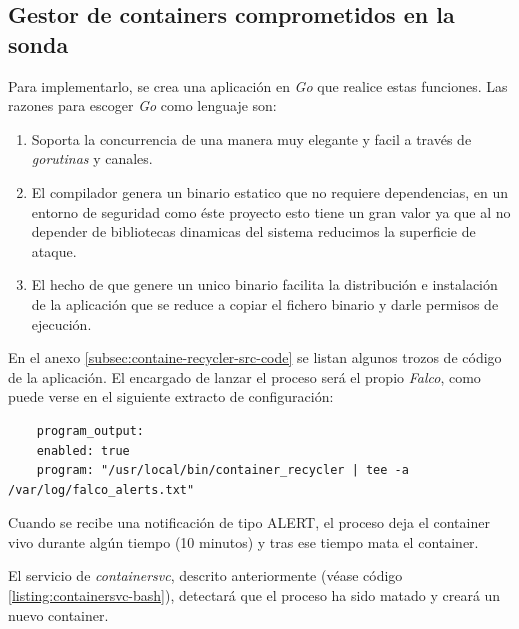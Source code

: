 \subsection{Gestor de containers comprometidos en la sonda}


Para implementarlo, se crea una aplicación en \emph{Go} que realice estas funciones. Las razones para escoger \emph{Go} como lenguaje son:

\begin{enumerate}
    \item Soporta la concurrencia de una manera muy elegante y facil a través de \emph{gorutinas} y canales.
    \item El compilador genera un binario estatico que no requiere dependencias, en un entorno de seguridad como éste proyecto esto
    tiene un gran valor ya que al no depender de bibliotecas dinamicas del sistema reducimos la superficie de ataque.
    \item El hecho de que genere un unico binario facilita la distribución e instalación de la aplicación que se reduce a copiar el fichero binario y darle permisos de ejecución.
\end{enumerate}

En el anexo \ref{subsec:containe-recycler-src-code} se listan algunos trozos de código de la aplicación. El encargado de lanzar el proceso será el propio
\emph{Falco}, como puede verse en el siguiente extracto de configuración:

\begin{verbatim}
    program_output:
    enabled: true
    program: "/usr/local/bin/container_recycler | tee -a /var/log/falco_alerts.txt"
\end{verbatim}
\bigskip


Cuando se recibe una notificación de tipo ALERT, el proceso deja el container vivo durante algún tiempo (10 minutos) y tras ese tiempo
mata el container.

El servicio de \emph{containersvc}, descrito anteriormente (véase código \ref{listing:containersvc-bash}), detectará que el proceso ha sido matado
y creará un nuevo container.

